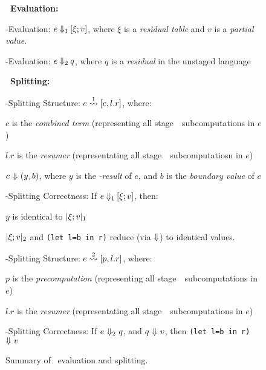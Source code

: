 \begin{figure*}

\textbf{\lang\ Evaluation:}

\hspace{2em}\bbone-Evaluation: $e\mathbin{{\Downarrow_{ 1}}}[\xi;v]$, where $\xi$ is a \emph{residual table} and $v$ is a \emph{partial value}. 

\hspace{2em}\bbtwo-Evaluation: $e\mathbin{{\Downarrow_{ 2}}}q$, where $q$ is a \emph{residual} in the unstaged language \langTwo


\vspace{.75em}
\textbf{\lang\ Splitting:}

\hspace{2em}\bbone-Splitting Structure: $e \overset{ 1}\rightsquigarrow [c,l.r]$, where:

\hspace{4em}$c$ is the \emph{combined term} (representing all stage~\bbone\ subcomputations in $e$)

\hspace{4em}$l.r$ is the \emph{resumer} (representating all stage~\bbtwo\ subcomputatiosn in $e$)

\hspace{4em}$c~{\Downarrow}~(y,b)$, where $y$ is the \emph{\bbone-result} of $e$, and $b$ is the \emph{boundary value} of $e$

 
\hspace{2em}\bbone-Splitting Correctness: If $e\mathbin{{\Downarrow_{ 1}}}[\xi;v]$, then:

\hspace{4em}$y$ is identical to $|\xi;v|_{ 1}$

\hspace{4em}$|\xi;v|_{ 2}$ and \texttt{(let l=b in r)} reduce (via ${\Downarrow}$) to identical values.  

\hspace{2em}\bbtwo-Splitting Structure: $e \overset{ 2}\rightsquigarrow [p,l.r]$, where:

\hspace{4em}$p$ is the \emph{precomputation} (representing all stage~\bbone\ subcomputations in $e$)

\hspace{4em}$l.r$ is the \emph{resumer} (representating all stage~\bbtwo\ subcomputations in $e$)

\hspace{2em}\bbtwo-Splitting Correctness: If $e~{\Downarrow_{ 2}}~q$, and $q~{\Downarrow}~v$, then \texttt{(let l=b in r)}~${\Downarrow}~v$


\caption{Summary of \lang\ evaluation and splitting.}
\label{fig:termSplitTwo}
\end{figure*}

